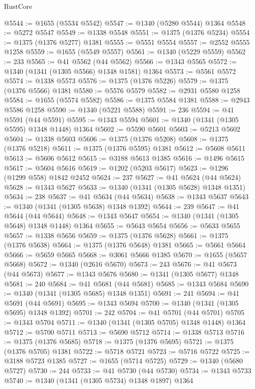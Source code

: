 \begin{lexlean}{RustCore}
\begin{coremodule}
@5544 := @1655 (@5534 @5542)
@5547 := @1340 (@5280 @5544) @1364
@5548 := @5272 @5547
@5549 := @1338 @5548
@5551 := @1375 (@1376 @5234)
@5554 := @1375 (@1376 @5277) @1381
@5555 := @5551 @5554
@5557 := @2552 @5555 @1258
@5559 := @1655 (@5549 @5557)
@5561 := @1340 (@5229 @5559)
@5562 := 233
@5565 := @41 @5562 (@44 @5562)
@5566 := @1343 @5565
@5572 := @1340 (@1341 (@1305 @5566) @1348 @1581) @1364
@5573 := @5561 @5572
@5574 := @1338 @5573
@5576 := @1375 (@1376 @5226)
@5579 := @1375 (@1376 @5566) @1381
@5580 := @5576 @5579
@5582 := @2931 @5580 @1258
@5584 := @1655 (@5574 @5582)
@5586 := @1375 @5584 @1381
@5588 := @2943 @5586 @1258
@5590 := @1340 (@5221 @5588)
@5591 := 236
@5594 := @41 @5591 (@44 @5591)
@5595 := @1343 @5594
@5601 := @1340 (@1341 (@1305 @5595) @1348 @1448) @1364
@5602 := @5590 @5601
@5603 := @5213 @5602
@5604 := @1338 @5603
@5606 := @1375 (@1376 @5208)
@5608 := @1375 (@1376 @5218)
@5611 := @1375 (@1376 @5595) @1381
@5612 := @5608 @5611
@5613 := @5606 @5612
@5615 := @3188 @5613 @1385
@5616 := @1496 @5615
@5617 := @5604 @5616
@5619 := @1202 (@5203 @5617)
@5623 := @1296 (@1299 @558) @1842 @2452
@5624 := 237
@5627 := @41 @5624 (@44 @5624)
@5628 := @1343 @5627
@5633 := @1340 (@1341 (@1305 @5628) @1348 @1351)
@5634 := 238
@5637 := @41 @5634 (@44 @5634)
@5638 := @1343 @5637
@5643 := @1340 (@1341 (@1305 @5638) @1348 @1392)
@5644 := 239
@5647 := @41 @5644 (@44 @5644)
@5648 := @1343 @5647
@5654 := @1340 (@1341 (@1305 @5648) @1348 @1448) @1364
@5655 := @5643 @5654
@5656 := @5633 @5655
@5657 := @1338 @5656
@5659 := @1375 (@1376 @5628)
@5661 := @1375 (@1376 @5638)
@5664 := @1375 (@1376 @5648) @1381
@5665 := @5661 @5664
@5666 := @5659 @5665
@5668 := @3061 @5666 @1385
@5670 := @1655 (@5657 @5668)
@5672 := @1340 (@2616 @5670)
@5673 := 243
@5676 := @41 @5673 (@44 @5673)
@5677 := @1343 @5676
@5680 := @1341 (@1305 @5677) @1348
@5681 := 240
@5684 := @41 @5681 (@44 @5681)
@5685 := @1343 @5684
@5690 := @1340 (@1341 (@1305 @5685) @1348 @1351)
@5691 := 241
@5694 := @41 @5691 (@44 @5691)
@5695 := @1343 @5694
@5700 := @1340 (@1341 (@1305 @5695) @1348 @1392)
@5701 := 242
@5704 := @41 @5701 (@44 @5701)
@5705 := @1343 @5704
@5711 := @1340 (@1341 (@1305 @5705) @1348 @1448) @1364
@5712 := @5700 @5711
@5713 := @5690 @5712
@5714 := @1338 @5713
@5716 := @1375 (@1376 @5685)
@5718 := @1375 (@1376 @5695)
@5721 := @1375 (@1376 @5705) @1381
@5722 := @5718 @5721
@5723 := @5716 @5722
@5725 := @3188 @5723 @1385
@5727 := @1655 (@5714 @5725)
@5729 := @1340 (@5680 @5727)
@5730 := 244
@5733 := @41 @5730 (@44 @5730)
@5734 := @1343 @5733
@5740 := @1340 (@1341 (@1305 @5734) @1348 @1897) @1364

\end{coremodule}
\end{lexlean}
